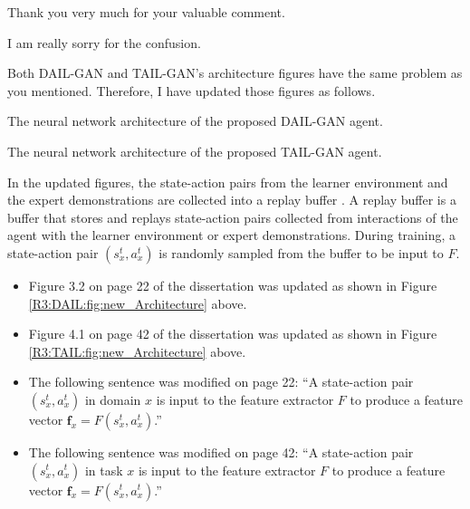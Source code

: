 \begin{revresponse}
  Thank you very much for your valuable comment.

  I am really sorry for the confusion.

  Both DAIL-GAN and TAIL-GAN's architecture figures have the same problem as you mentioned.
  Therefore, I have updated those figures as follows.

  {The neural network architecture of the proposed DAIL-GAN agent.\label{R3:DAIL:fig:new_Architecture}}

  {The neural network architecture of the proposed TAIL-GAN agent.\label{R3:TAIL:fig:new_Architecture}}

  In the updated figures,
  the state-action pairs from the learner environment and the expert demonstrations are collected into a replay buffer \cite{zhang2017deeper}.
  A replay buffer is a buffer that stores and replays state-action pairs collected from interactions of the agent with the learner environment or expert demonstrations.
  During training,
  a state-action pair $(s^t_x, a^t_x)$ is randomly sampled from the buffer to be input to $F$.


  \begin{correction}
    \begin{itemize}
      \item Figure 3.2 on page 22 of the dissertation was updated as shown in Figure \ref{R3:DAIL:fig:new_Architecture} above.
      \item Figure 4.1 on page 42 of the dissertation was updated as shown in Figure \ref{R3:TAIL:fig:new_Architecture} above.
      \item The following sentence was modified on page 22: \enquote{A state-action pair $(s^t_x, a^t_x)$ in domain $x$ is  input to the feature extractor $F$ to produce a feature vector $\mathbf{f}_x=F(s^t_x, a^t_x)$.}
      \item The following sentence was modified on page 42: \enquote{A state-action pair $(s^t_x, a^t_x)$ in task $x$ is  input to the feature extractor $F$ to produce a feature vector $\mathbf{f}_x=F(s^t_x, a^t_x)$.}
    \end{itemize}
  \end{correction}
\end{revresponse}

